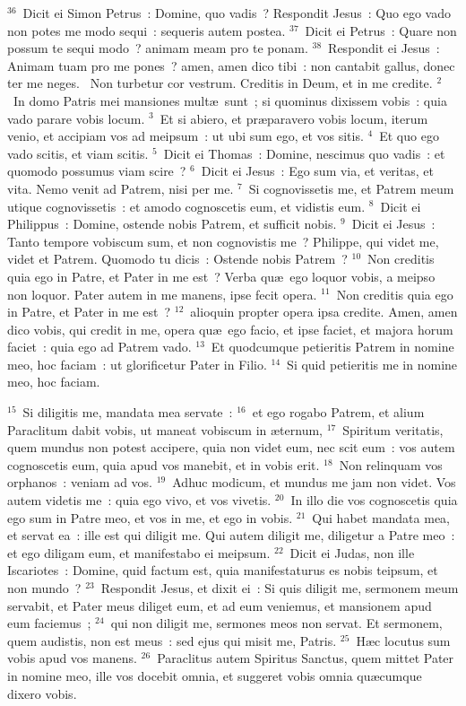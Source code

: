 ${}^{36}$~Dicit ei Simon Petrus~: Domine, quo vadis~? Respondit Jesus~: Quo ego vado non potes me modo sequi~: sequeris autem postea.
${}^{37}$~Dicit ei Petrus~: Quare non possum te sequi modo~? animam meam pro te ponam.
${}^{38}$~Respondit ei Jesus~: Animam tuam pro me pones~? amen, amen dico tibi~: non cantabit gallus, donec ter me neges.
~\lettrine[lines=10,image=true,loversize=0.05,lraise=-0.03]{N}{}on turbetur cor vestrum. Creditis in Deum, et in me credite.
${}^{2}$~In domo Patris mei mansiones mult\ae\ sunt~; si quominus dixissem vobis~: quia vado parare vobis locum.
${}^{3}$~Et si abiero, et pr\ae paravero vobis locum, iterum venio, et accipiam vos ad meipsum~: ut ubi sum ego, et vos sitis.
${}^{4}$~Et quo ego vado scitis, et viam scitis.
${}^{5}$~Dicit ei Thomas~: Domine, nescimus quo vadis~: et quomodo possumus viam scire~?
${}^{6}$~Dicit ei Jesus~: Ego sum via, et veritas, et vita. Nemo venit ad Patrem, nisi per me.
${}^{7}$~Si cognovissetis me, et Patrem meum utique cognovissetis~: et amodo cognoscetis eum, et vidistis eum.
${}^{8}$~Dicit ei Philippus~: Domine, ostende nobis Patrem, et sufficit nobis.
${}^{9}$~Dicit ei Jesus~: Tanto tempore vobiscum sum, et non cognovistis me~? Philippe, qui videt me, videt et Patrem. Quomodo tu dicis~: Ostende nobis Patrem~?
${}^{10}$~Non creditis quia ego in Patre, et Pater in me est~? Verba qu\ae\ ego loquor vobis, a meipso non loquor. Pater autem in me manens, ipse fecit opera.
${}^{11}$~Non creditis quia ego in Patre, et Pater in me est~?
${}^{12}$~alioquin propter opera ipsa credite. Amen, amen dico vobis, qui credit in me, opera qu\ae\ ego facio, et ipse faciet, et majora horum faciet~: quia ego ad Patrem vado.
${}^{13}$~Et quodcumque petieritis Patrem in nomine meo, hoc faciam~: ut glorificetur Pater in Filio.
${}^{14}$~Si quid petieritis me in nomine meo, hoc faciam.


${}^{15}$~Si diligitis me, mandata mea servate~:
${}^{16}$~et ego rogabo Patrem, et alium Paraclitum dabit vobis, ut maneat vobiscum in \ae ternum,
${}^{17}$~Spiritum veritatis, quem mundus non potest accipere, quia non videt eum, nec scit eum~: vos autem cognoscetis eum, quia apud vos manebit, et in vobis erit.
${}^{18}$~Non relinquam vos orphanos~: veniam ad vos.
${}^{19}$~Adhuc modicum, et mundus me jam non videt. Vos autem videtis me~: quia ego vivo, et vos vivetis.
${}^{20}$~In illo die vos cognoscetis quia ego sum in Patre meo, et vos in me, et ego in vobis.
${}^{21}$~Qui habet mandata mea, et servat ea~: ille est qui diligit me. Qui autem diligit me, diligetur a Patre meo~: et ego diligam eum, et manifestabo ei meipsum.
${}^{22}$~Dicit ei Judas, non ille Iscariotes~: Domine, quid factum est, quia manifestaturus es nobis teipsum, et non mundo~?
${}^{23}$~Respondit Jesus, et dixit ei~: Si quis diligit me, sermonem meum servabit, et Pater meus diliget eum, et ad eum veniemus, et mansionem apud eum faciemus~;
${}^{24}$~qui non diligit me, sermones meos non servat. Et sermonem, quem audistis, non est meus~: sed ejus qui misit me, Patris.
${}^{25}$~H\ae c locutus sum vobis apud vos manens.
${}^{26}$~Paraclitus autem Spiritus Sanctus, quem mittet Pater in nomine meo, ille vos docebit omnia, et suggeret vobis omnia qu\ae cumque dixero vobis.


